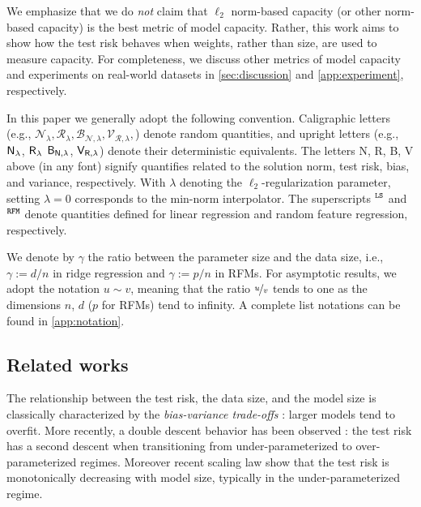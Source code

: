 We emphasize that we do \emph{not} claim that $\ell_2$ norm-based capacity (or other norm-based capacity) is the best metric of model capacity. Rather, this work aims to show how the test risk behaves when weights, rather than size, are used to measure capacity. For completeness, we discuss other metrics of model capacity and experiments on real-world datasets in \cref{sec:discussion} and \cref{app:experiment}, respectively.

 In this paper we generally adopt the following convention. Caligraphic letters (e.g., \(\mathcal{N}_{\lambda}, \mathcal{R}_{\lambda}, \mathcal{B}_{\mathcal{N},\lambda}, \mathcal{V}_{\mathcal{R},\lambda}, \)) denote random quantities, and upright letters (e.g., \(\mathsf N_{\lambda}\), \(\mathsf R_{\lambda}\) \(\mathsf B_{\mathsf N,\lambda}\), \(\mathsf V_{\mathsf R,\lambda}\)) denote their deterministic equivalents. The letters N, R, B, V above (in any font) signify  quantifies related to the solution norm, test risk, bias, and variance, respectively. 
With $\lambda$ denoting the $\ell_2$-regularization parameter, setting $\lambda=0$ corresponds to the min-norm interpolator. The superscripts $\textsuperscript{\tt LS}$ and $\textsuperscript{\tt RFM}$ denote quantities defined for linear regression and random feature regression, respectively.


We denote by $\gamma$  the ratio between the parameter size and the data size, i.e., $\gamma:=d/n$ in ridge regression and $\gamma:=p/n$ in RFMs.
For asymptotic results, we adopt the notation \( u \sim v \), meaning that the ratio \( \nicefrac{u}{v} \) tends to one as the dimensions \( n \), \( d \) (\( p \) for RFMs) tend to infinity. A complete list notations can be found in \cref{app:notation}.

\subsection{Related works}

The relationship between the test risk, the data size, and the model size is classically characterized by the  \emph{bias-variance trade-offs} \citep{Vapnik2000The}: larger models tend to overfit. More recently, a double descent behavior has been observed \citep{belkin2019reconciling}: the test risk has a second descent when transitioning from under-parameterized to over-parameterized regimes. Moreover recent scaling law \citep{kaplan2020scaling} show that  the test risk is monotonically decreasing with model size, typically in the under-parameterized regime. 

